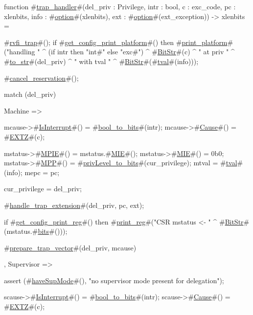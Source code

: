 function #\hyperref[sailRISCVztrapzyhandler]{trap\_handler}#(del_priv : Privilege, intr : bool, c : exc_code, pc : xlenbits, info : #\hyperref[sailRISCVzoption]{option}#(xlenbits), ext : #\hyperref[sailRISCVzoption]{option}#(ext_exception))
                     -> xlenbits = {
  #\hyperref[sailRISCVzrvfizytrap]{rvfi\_trap}#();
  if   #\hyperref[sailRISCVzgetzyconfigzyprintzyplatform]{get\_config\_print\_platform}#()
  then #\hyperref[sailRISCVzprintzyplatform]{print\_platform}#("handling " ^ (if intr then "int#" else "exc#")
                      ^ #\hyperref[sailRISCVzBitStr]{BitStr}#(c) ^ " at priv " ^ #\hyperref[sailRISCVztozystr]{to\_str}#(del_priv)
                      ^ " with tval " ^ #\hyperref[sailRISCVzBitStr]{BitStr}#(#\hyperref[sailRISCVztval]{tval}#(info)));

  #\hyperref[sailRISCVzcancelzyreservation]{cancel\_reservation}#();

  match (del_priv) {
    Machine => {
       mcause->#\hyperref[sailRISCVzIsInterrupt]{IsInterrupt}#() = #\hyperref[sailRISCVzboolzytozybits]{bool\_to\_bits}#(intr);
       mcause->#\hyperref[sailRISCVzCause]{Cause}#()       = #\hyperref[sailRISCVzEXTZ]{EXTZ}#(c);

       mstatus->#\hyperref[sailRISCVzMPIE]{MPIE}#() = mstatus.#\hyperref[sailRISCVzMIE]{MIE}#();
       mstatus->#\hyperref[sailRISCVzMIE]{MIE}#()  = 0b0;
       mstatus->#\hyperref[sailRISCVzMPP]{MPP}#()  = #\hyperref[sailRISCVzprivLevelzytozybits]{privLevel\_to\_bits}#(cur_privilege);
       mtval           = #\hyperref[sailRISCVztval]{tval}#(info);
       mepc            = pc;

       cur_privilege   = del_priv;

       #\hyperref[sailRISCVzhandlezytrapzyextension]{handle\_trap\_extension}#(del_priv, pc, ext);

       if   #\hyperref[sailRISCVzgetzyconfigzyprintzyreg]{get\_config\_print\_reg}#()
       then #\hyperref[sailRISCVzprintzyreg]{print\_reg}#("CSR mstatus <- " ^ #\hyperref[sailRISCVzBitStr]{BitStr}#(mstatus.#\hyperref[sailRISCVzbits]{bits}#()));

       #\hyperref[sailRISCVzpreparezytrapzyvector]{prepare\_trap\_vector}#(del_priv, mcause)
    },
    Supervisor => {
       assert (#\hyperref[sailRISCVzhaveSupMode]{haveSupMode}#(), "no supervisor mode present for delegation");

       scause->#\hyperref[sailRISCVzIsInterrupt]{IsInterrupt}#() = #\hyperref[sailRISCVzboolzytozybits]{bool\_to\_bits}#(intr);
       scause->#\hyperref[sailRISCVzCause]{Cause}#()       = #\hyperref[sailRISCVzEXTZ]{EXTZ}#(c);

}}}
